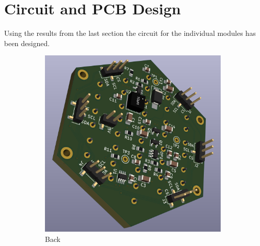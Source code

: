 \chapter{Circuit and PCB Design}
%
Using the results from the last section the circuit for the individual modules has been designed.
%




%
\begin{figure}[ht]
  \centering
  \begin{subfigure}[b]{0.6\textwidth}
    \includegraphics[width=\textwidth]{src/assets/pictures/circuit/pcb_back.png}
    \caption{Back}
    \label{fig:pcb:back}
  \end{subfigure}
  \\
  \begin{subfigure}[b]{0.6\textwidth}

\end{subfigure}
\end{figure}

